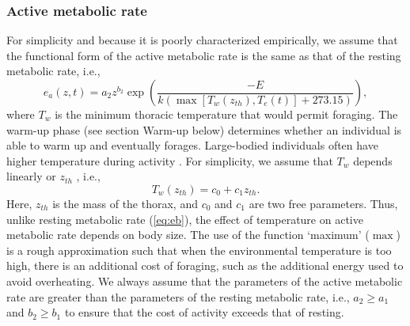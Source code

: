 \subsubsection*{Active metabolic rate}
For simplicity and because it is poorly characterized empirically, we assume that the functional form of the active metabolic rate is the same as that of the resting metabolic rate, i.e., 
\begin{equation} \label{eq:ea}
	e_a(z,t) = a_2 z^{b_2}  \exp \left(\frac{-E}{k (\max[T_w(z_{th}), T_e(t)]+ 273.15)} \right),
\end{equation}
where $T_w$ is the minimum thoracic temperature that would permit foraging.
The warm-up phase (see section Warm-up below) determines whether an individual is able to warm up and eventually forages. %
Large-bodied individuals often have higher temperature during activity \citep{Bartholomew1977a}. %
For simplicity, we assume that $T_w$ depends linearly or $z_{th}$ \citep{Bartholomew1977a}, i.e.,
\begin{equation} \label{eq:Tw}
	T_w(z_{th}) = c_0+ c_1 z_{th}.
\end{equation}
Here, $z_{th}$ is the mass of the thorax, and $c_0$ and $c_1$ are two free parameters.
Thus, unlike resting metabolic rate (\cref{eq:eb}), the effect of temperature on active metabolic rate depends on body size.
The use of the function `maximum' ($\max$) is a rough approximation such that when the environmental temperature is too high, there is an additional cost of foraging, such as the additional energy used to avoid overheating. 
We always assume that the parameters of the active metabolic rate are greater than the parameters of the resting metabolic rate, i.e., $a_2 \geq a_1$ and $b_2 \geq b_1$ to ensure that the cost of activity exceeds that of resting.

